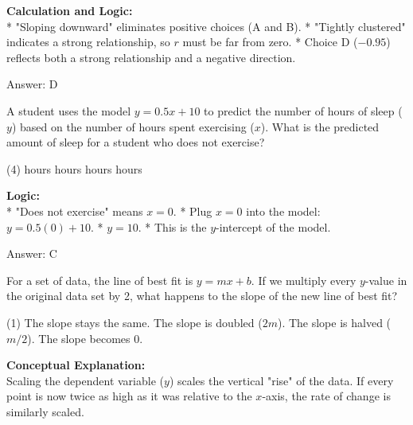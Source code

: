 \documentclass[11pt,paper=a4,answers]{exam}
\begin{document}
\begin{questions}
\begin{solution}
\vspace{30pt}

\textbf{Calculation and Logic:} \\
* "Sloping downward" eliminates positive choices (A and B).
* "Tightly clustered" indicates a strong relationship, so $r$ must be far from zero.
* Choice D ($-0.95$) reflects both a strong relationship and a negative direction.

\vspace{30pt}

Answer: \colorbox{yellow!100}{D}
\end{solution}

\vspace{60pt}

\question
A student uses the model $y = 0.5x + 10$ to predict the number of hours of sleep ($y$) based on the number of hours spent exercising ($x$). What is the predicted amount of sleep for a student who does not exercise?
\begin{tasks}(4)
     hours
     hours
     hours
     hours
\end{tasks}

\begin{solution}
\textbf{Logic:} \\
* "Does not exercise" means $x = 0$.
* Plug $x = 0$ into the model: $y = 0.5(0) + 10$.
* $y = 10$.
* This is the $y$-intercept of the model.

\vspace{30pt}

Answer: \colorbox{yellow!100}{C}
\end{solution}

\vspace{60pt}

\question
For a set of data, the line of best fit is $y = mx + b$. If we multiply every $y$-value in the original data set by 2, what happens to the slope of the new line of best fit?
\begin{tasks}(1)
    \task The slope stays the same.
    \task The slope is doubled ($2m$).
    \task The slope is halved ($m/2$).
    \task The slope becomes 0.
\end{tasks}

\begin{solution}
\textbf{Conceptual Explanation:} \\
Scaling the dependent variable ($y$) scales the vertical "rise" of the data. If every point is now twice as high as it was relative to the $x$-axis, the rate of change is similarly scaled.


\end{solution}
\end{questions}
\end{document}
